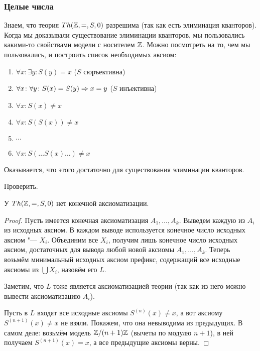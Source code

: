 \subsubsection{Целые числа}
Знаем, что теория $Th(\mathbb{Z}, =, S, 0)$ разрешима (так как есть элиминация кванторов).
Когда мы доказывали существование элиминации кванторов, мы пользовались какими-то
свойствами модели с носителем $\mathbb{Z}$.
Можно посмотреть на то, чем мы пользовались, и построить список необходимых аксиом:
\begin{enumerate}
	\item $\forall x \colon \exists y \colon S(y)=x$ ($S$ сюръективна)
	\item $\forall x \colon \forall y \colon S(x) = S(y) \Rightarrow x = y$ ($S$ инъективна)
	\item $\forall x \colon S(x) \ne x$
	\item $\forall x \colon S(S(x)) \ne x$
	\item $\cdots$
	\item $\forall x \colon S(\dots S(x) \dots) \ne x$
\end{enumerate}
Оказывается, что этого достаточно для существования элиминации кванторов.
\begin{Exercise}
	Проверить.
\end{Exercise}

\begin{theorem}
	У $Th(\mathbb{Z}, =, S, 0)$ нет конечной аксиоматизации.
\end{theorem}
\begin{proof}
	Пусть имеется конечная аксиоматизация $A_1, \dots, A_k$.
	Выведем каждую из $A_i$ из исходных аксиом.
	В каждом выводе используется конечное число исходных аксиом "--- $X_i$.
	Объединим все $X_i$, получим лишь конечное число исходных аксиом,
	достаточных для вывода любой новой аксиомы $A_1, \dots, A_k$.
	Теперь возьмём минимальный исходных аксиом префикс, содержащий все исходные аксиомы из $\bigcup X_i$,
	назовём его $L$.

	Заметим, что $L$ тоже является аксиоматизацией теории (так как из него можно вывести
	аксиоматизацию $A_i$).

	Пусть в $L$ входят все исходные аксиомы $S^{(n)}(x) \ne x$, а вот аксиому $S^{(n+1)}(x) \ne x$ не взяли.
	Покажем, что она невыводима из предыдущих.
	В самом деле: возьмём модель $\mathbb{Z}/(n+1)\mathbb{Z}$ (вычеты по модулю $n+1$), в ней получаем $S^{(n+1)}(x) = x$,
	а все предыдущие аксиомы верны.
\end{proof}

